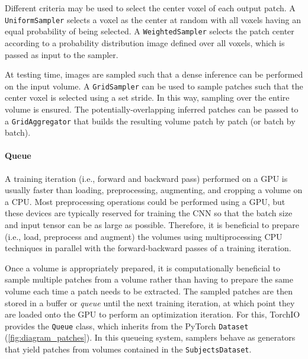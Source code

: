 Different criteria may be used to select the center voxel of each output
patch.
%
A \texttt{UniformSampler} selects a voxel as the center at random with all
voxels having an equal probability of being selected.
%
A \texttt{WeightedSampler} selects the patch center according to a
probability distribution image defined over all voxels,
which is passed as input to the sampler.


At testing time, images are sampled such that a dense inference can be performed on the input volume.
%
A \texttt{GridSampler} can be used to sample patches such that the center voxel is selected using a set stride.
%
In this way, sampling over the entire volume is ensured.
%
The potentially-overlapping inferred patches can be passed to a \texttt{GridAggregator} that builds
the resulting volume patch by patch (or batch by batch).  %


\paragraph{Queue}

A training iteration (i.e., forward and backward pass) performed on a \ac{GPU}
is usually faster than loading, preprocessing, augmenting, and cropping a volume
on a \ac{CPU}.
%
Most preprocessing operations could be performed using a \ac{GPU},
but these devices are typically reserved for training the \ac{CNN} so that
the batch size and input tensor can be as large as possible.
%
Therefore, it is beneficial to prepare
(i.e., load, preprocess and augment) the volumes using multiprocessing
\ac{CPU} techniques in parallel with the forward-backward passes of a training iteration.


Once a volume is appropriately prepared, it is computationally beneficial to
sample multiple patches from a volume rather than having to prepare the same
volume each time a patch needs to be extracted.
%
The sampled patches are then stored in a buffer or \textit{queue} until
the next training iteration, at which point they are loaded onto the \ac{GPU}
to perform an optimization iteration.
%
For this, TorchIO provides the \texttt{Queue} class, which inherits from the
PyTorch \texttt{Dataset} (\cref{fig:diagram_patches}).
%
In this queueing system,
samplers behave as generators that yield patches
from volumes contained in the \texttt{SubjectsDataset}.


